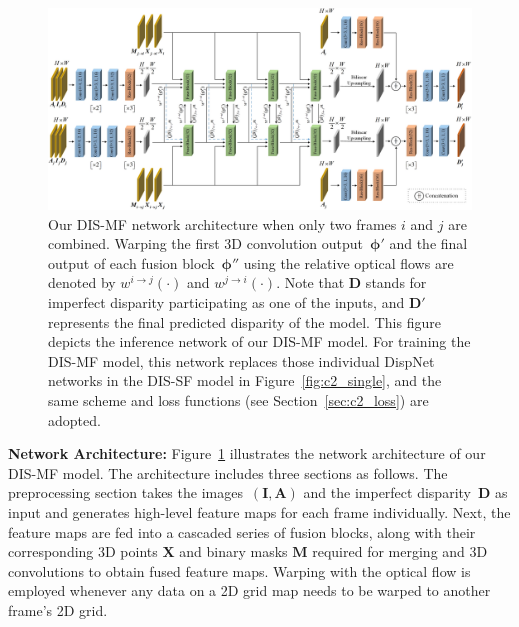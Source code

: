 \begin{figure}[t]
    \begin{center}
        \includegraphics[width=1.0\linewidth]{images/chapter2/figures/Fig3.jpg}
    \end{center}
   \caption{Our DIS-MF network architecture when only two frames $i$ and $j$ are combined. Warping the first 3D convolution output~$\boldsymbol{\phi'}$ and the final output of each fusion block~$\boldsymbol{\phi''}$ using the relative optical flows are denoted by $w^{i \rightarrow j}(\cdot)$ and $w^{j \rightarrow i}(\cdot)$. Note that $\boldsymbol{D}$ stands for imperfect disparity participating as one of the inputs, and $\boldsymbol{D'}$ represents the final predicted disparity of the model. This figure depicts the inference network of our DIS-MF model. For training the DIS-MF model, this network replaces those individual DispNet~\citep{mayer2016large} networks in the DIS-SF model in Figure~\ref{fig:c2_single}, and the same scheme and loss functions (see Section~\ref{sec:c2_loss}) are adopted.}
    \label{fig:c2_architecture}
\end{figure}

\bigbreak\noindent\textbf{Network Architecture:} Figure~\ref{fig:c2_architecture} illustrates the network architecture of our DIS-MF model. The architecture includes three sections as follows. The preprocessing section takes the images~$(\boldsymbol{I},\boldsymbol{A})$ and the imperfect disparity~$\boldsymbol{D}$ as input and generates high-level feature maps for each frame individually. Next, the feature maps are fed into a cascaded series of fusion blocks, along with their corresponding 3D points $\boldsymbol{X}$ and binary masks $\boldsymbol{M}$ required for merging and 3D convolutions to obtain fused feature maps. Warping with the optical flow is employed whenever any data on a 2D grid map needs to be warped to another frame's 2D grid.

